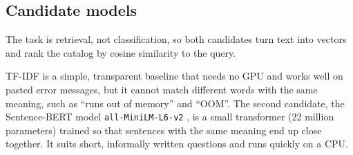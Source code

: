 \subsection{Candidate models}

The task is retrieval, not classification, so both candidates turn text into vectors and rank the
catalog by cosine similarity to the query.

TF-IDF \cite{sklearn} is a simple, transparent baseline that needs no GPU and works well on pasted error
messages, but it cannot match different words with the same meaning, such as ``runs out of memory'' and
``OOM''. The second candidate, the Sentence-BERT model \texttt{all-MiniLM-L6-v2}
\cite{reimers2019sbert,wang2020minilm}, is a small transformer (22 million parameters) trained so that
sentences with the same meaning end up close together. It suits short, informally written questions and
runs quickly on a CPU.
